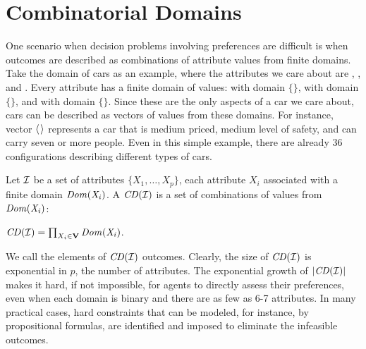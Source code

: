 \section{Combinatorial Domains \label{sec:comb_domains}}
One scenario when decision problems involving preferences are difficult is when outcomes
are described as combinations of attribute values from finite domains.
Take the domain of cars as an example, where the attributes we care about are
, , and .
Every attribute has a finite domain of values:
 with domain $\{$$\}$,
 with domain $\{$$\}$, and
 with domain $\{$$\}$.
Since these are the only aspects of a car we care about, cars can be
described as vectors of values from these domains.
For instance, vector $\mathit{\langle}$$\mathit{\rangle}$ represents
a car that is medium priced, medium level of safety, and can carry seven
or more people.
Even in this simple example, there are already 36 configurations describing
different types of cars.

\begin{definition}
	Let $\mathcal{I}$ be a set of attributes $\{X_1,\ldots,X_p\}$, each attribute $X_i$
	associated with a finite domain $\it{Dom}(X_i)$.
	A  $\mathit{CD}(\mathcal{I})$ is a set of 
	combinations of values from $\it{Dom}(X_i)$:
	\begin{center}
		$\mathit{CD}(\mathcal{I}) = \prod_{X_i \in \textbf{V}} \it{Dom}(X_i)$.
	\end{center}
\end{definition}


We call the elements of $\mathit{CD}(\mathcal{I})$ outcomes.
Clearly, the size of $\mathit{CD}(\mathcal{I})$ is exponential in $p$, the number of attributes.
The exponential growth of $|\mathit{CD}(\mathcal{I})|$ makes it hard, if not impossible, for agents
to directly assess their preferences, even when each domain is binary and
there are as few as 6-7 attributes.
In many practical cases, hard constraints that can be modeled, for instance, 
by propositional formulas, are identified and imposed 
to eliminate the infeasible outcomes.



